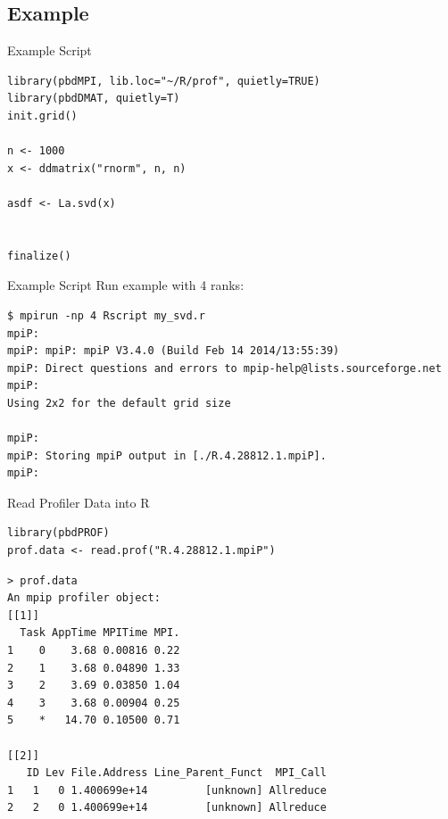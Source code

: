 \subsection{Example}

\begin{frame}[fragile]
  \begin{block}{Example Script}
\begin{lstlisting}[title=my\_svd.r]
library(pbdMPI, lib.loc="~/R/prof", quietly=TRUE)
library(pbdDMAT, quietly=T)
init.grid()

n <- 1000
x <- ddmatrix("rnorm", n, n)

asdf <- La.svd(x)


finalize()
\end{lstlisting}
  \end{block}
\end{frame}

\begin{frame}[fragile]
  \begin{block}{Example Script}
Run example with 4 ranks:
\begin{lstlisting}[language=shl]
$ mpirun -np 4 Rscript my_svd.r
mpiP: 
mpiP: mpiP: mpiP V3.4.0 (Build Feb 14 2014/13:55:39)
mpiP: Direct questions and errors to mpip-help@lists.sourceforge.net
mpiP: 
Using 2x2 for the default grid size

mpiP: 
mpiP: Storing mpiP output in [./R.4.28812.1.mpiP].
mpiP: 
\end{lstlisting}
  \end{block}
\end{frame}



\begin{frame}[fragile]
  \begin{block}{Read Profiler Data into R}
\vspace{-.2cm}
\begin{lstlisting}[title=Interactively (or in batch) Read in Profiler Data]
library(pbdPROF)
prof.data <- read.prof("R.4.28812.1.mpiP") 
\end{lstlisting}
\vspace{-.2cm}
\begin{lstlisting}[language=shl,title=Partial Output of Example Data]
> prof.data
An mpip profiler object:
[[1]]
  Task AppTime MPITime MPI.
1    0    3.68 0.00816 0.22
2    1    3.68 0.04890 1.33
3    2    3.69 0.03850 1.04
4    3    3.68 0.00904 0.25
5    *   14.70 0.10500 0.71

[[2]]
   ID Lev File.Address Line_Parent_Funct  MPI_Call
1   1   0 1.400699e+14         [unknown] Allreduce
2   2   0 1.400699e+14         [unknown] Allreduce
\end{lstlisting}
  \end{block}
\end{frame}



